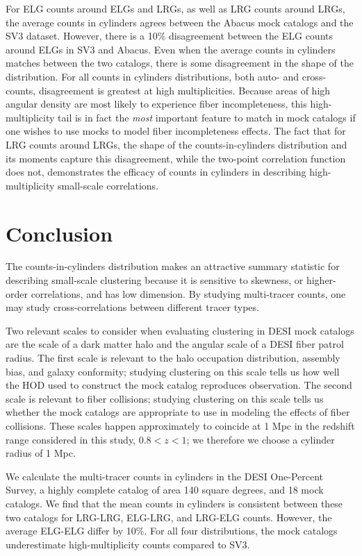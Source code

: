 \documentclass[fleqn,usenatbib]{mnras}
\begin{document}
For ELG counts around ELGs and LRGs, as well as LRG counts around LRGs, the average counts in cylinders agrees between the Abacus mock catalogs and the SV3 dataset. However, there is a 10\% disagreement between the ELG counts around ELGs in SV3 and Abacus. Even when the average counts in cylinders matches between the two catalogs, there is some disagreement in the shape of the distribution. For all counts in cylinders distributions, both auto- and cross-counts, disagreement is greatest at high multiplicities. Because areas of high angular density are most likely to experience fiber incompleteness, this high-multiplicity tail is in fact the \textit{most} important feature to match in mock catalogs if one wishes to use mocks to model fiber incompleteness effects. The fact that for LRG counts around LRGs, the shape of the counts-in-cylinders distribution and its moments capture this disagreement, while the two-point correlation function does not, demonstrates the efficacy of counts in cylinders in describing high-multiplicity small-scale correlations.

\section*{Conclusion}
The counts-in-cylinders distribution makes an attractive summary statistic for describing small-scale clustering because it is sensitive to skewness, or higher-order correlations, and has low dimension. By studying multi-tracer counts, one may study cross-correlations between different tracer types. 

Two relevant scales to consider when evaluating clustering in DESI mock catalogs are the scale of a dark matter halo and the angular scale of a DESI fiber patrol radius. The first scale is relevant to the halo occupation distribution, assembly bias, and galaxy conformity; studying clustering on this scale tells us how well the HOD used to construct the mock catalog reproduces observation. The second scale is relevant to fiber collisions; studying clustering on this scale tells us whether the mock catalogs are appropriate to use in modeling the effects of fiber collisions. These scales happen approximately to coincide at 1 Mpc in the redshift range considered in this study, $0.8 <z<1$; we therefore we choose a cylinder radius of 1 Mpc.


We calculate the multi-tracer counts in cylinders in the DESI One-Percent Survey, a highly complete catalog of area 140 square degrees, and 18 mock catalogs. We find that the mean counts in cylinders is consistent between these two catalogs for LRG-LRG, ELG-LRG, and LRG-ELG counts.  However, the average ELG-ELG differ by 10\%. For all four distributions, the mock catalogs underestimate high-multiplicity counts compared to SV3.
\end{document}
